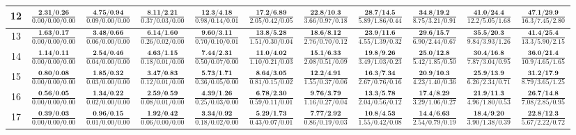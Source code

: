\documentclass{slides}
\begin{document}
{{{\begin{tabular}{|c|c|c|c|c|c|c|c|c|c|c|}
\hline
12 & $\frac{\textbf{2.31/0.26}}{0.00/0.00/0.00}$ & $\frac{\textbf{4.75/0.94}}{0.09/0.00/0.00}$ & $\frac{\textbf{8.11/2.21}}{0.37/0.03/0.00}$ & $\frac{\textbf{12.3/4.18}}{0.98/0.14/0.01}$ & $\frac{\textbf{17.2/6.89}}{2.05/0.42/0.05}$ & $\frac{\textbf{22.8/10.3}}{3.66/0.97/0.18}$ & $\frac{\textbf{28.7/14.5}}{5.89/1.86/0.44}$ & $\frac{\textbf{34.8/19.2}}{8.75/3.21/0.91}$ & $\frac{\textbf{41.0/24.4}}{12.2/5.05/1.68}$ & $\frac{\textbf{47.1/29.9}}{16.3/7.45/2.80}$ \\
\hline
13 & $\frac{\textbf{1.63/0.17}}{0.00/0.00/0.00}$ & $\frac{\textbf{3.48/0.66}}{0.06/0.00/0.00}$ & $\frac{\textbf{6.14/1.60}}{0.26/0.02/0.00}$ & $\frac{\textbf{9.60/3.11}}{0.70/0.10/0.01}$ & $\frac{\textbf{13.8/5.28}}{1.51/0.30/0.04}$ & $\frac{\textbf{18.6/8.12}}{2.76/0.70/0.12}$ & $\frac{\textbf{23.9/11.6}}{4.55/1.39/0.32}$ & $\frac{\textbf{29.6/15.7}}{6.90/2.44/0.67}$ & $\frac{\textbf{35.5/20.3}}{9.84/3.93/1.26}$ & $\frac{\textbf{41.4/25.4}}{13.3/5.90/2.15}$ \\
\hline
14 & $\frac{\textbf{1.14/0.11}}{0.00/0.00/0.00}$ & $\frac{\textbf{2.54/0.46}}{0.04/0.00/0.00}$ & $\frac{\textbf{4.63/1.15}}{0.18/0.01/0.00}$ & $\frac{\textbf{7.44/2.31}}{0.50/0.07/0.00}$ & $\frac{\textbf{11.0/4.02}}{1.10/0.21/0.03}$ & $\frac{\textbf{15.1/6.33}}{2.08/0.51/0.09}$ & $\frac{\textbf{19.8/9.26}}{3.49/1.03/0.23}$ & $\frac{\textbf{25.0/12.8}}{5.42/1.85/0.50}$ & $\frac{\textbf{30.4/16.8}}{7.87/3.04/0.95}$ & $\frac{\textbf{36.0/21.4}}{10.9/4.65/1.65}$ \\
\hline
15 & $\frac{\textbf{0.80/0.08}}{0.00/0.00/0.00}$ & $\frac{\textbf{1.85/0.32}}{0.03/0.00/0.00}$ & $\frac{\textbf{3.47/0.83}}{0.12/0.01/0.00}$ & $\frac{\textbf{5.73/1.71}}{0.36/0.05/0.00}$ & $\frac{\textbf{8.64/3.05}}{0.81/0.15/0.02}$ & $\frac{\textbf{12.2/4.91}}{1.55/0.37/0.06}$ & $\frac{\textbf{16.3/7.34}}{2.67/0.76/0.16}$ & $\frac{\textbf{20.9/10.3}}{4.23/1.40/0.36}$ & $\frac{\textbf{25.9/13.9}}{6.26/2.34/0.71}$ & $\frac{\textbf{31.2/17.9}}{8.79/3.65/1.25}$ \\
\hline
16 & $\frac{\textbf{0.56/0.05}}{0.00/0.00/0.00}$ & $\frac{\textbf{1.34/0.22}}{0.02/0.00/0.00}$ & $\frac{\textbf{2.59/0.59}}{0.08/0.01/0.00}$ & $\frac{\textbf{4.39/1.26}}{0.25/0.03/0.00}$ & $\frac{\textbf{6.78/2.30}}{0.59/0.11/0.01}$ & $\frac{\textbf{9.76/3.79}}{1.16/0.27/0.04}$ & $\frac{\textbf{13.3/5.78}}{2.04/0.56/0.12}$ & $\frac{\textbf{17.4/8.29}}{3.29/1.06/0.27}$ & $\frac{\textbf{21.9/11.3}}{4.96/1.80/0.53}$ & $\frac{\textbf{26.7/14.8}}{7.08/2.85/0.95}$ \\
\hline
17 & $\frac{\textbf{0.39/0.03}}{0.00/0.00/0.00}$ & $\frac{\textbf{0.96/0.15}}{0.01/0.00/0.00}$ & $\frac{\textbf{1.92/0.42}}{0.06/0.00/0.00}$ & $\frac{\textbf{3.34/0.92}}{0.18/0.02/0.00}$ & $\frac{\textbf{5.29/1.73}}{0.43/0.07/0.01}$ & $\frac{\textbf{7.77/2.92}}{0.86/0.19/0.03}$ & $\frac{\textbf{10.8/4.53}}{1.55/0.42/0.08}$ & $\frac{\textbf{14.4/6.63}}{2.54/0.79/0.19}$ & $\frac{\textbf{18.4/9.20}}{3.90/1.38/0.39}$ & $\frac{\textbf{22.8/12.3}}{5.67/2.22/0.72}$ \\

\end{tabular}}}}
\end{document}
